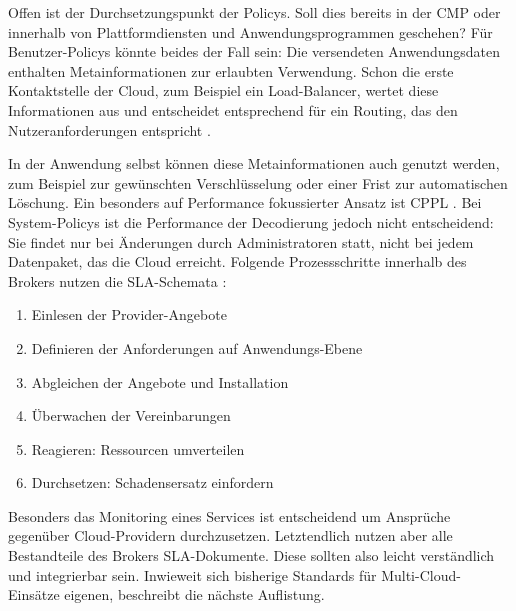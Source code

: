 Offen ist der Durchsetzungspunkt der Policys. Soll dies bereits in der CMP oder innerhalb von Plattformdiensten und Anwendungsprogrammen geschehen? Für Benutzer-Policys könnte beides der Fall sein: Die versendeten Anwendungsdaten enthalten Metainformationen zur erlaubten Verwendung. Schon die erste Kontaktstelle der Cloud, zum Beispiel ein Load-Balancer, wertet diese Informationen aus und entscheidet entsprechend für ein Routing, das den Nutzeranforderungen entspricht \cite{henze:2013:requirements-aware}. 

In der Anwendung selbst können diese Metainformationen auch genutzt werden, zum Beispiel zur gewünschten Verschlüsselung oder einer Frist zur automatischen Löschung. Ein besonders auf Performance fokussierter Ansatz ist CPPL \cite{henze:2016:cppl}. Bei System-Policys ist die Performance der Decodierung jedoch nicht entscheidend: Sie findet nur bei Änderungen durch Administratoren statt, nicht bei jedem Datenpaket, das die Cloud erreicht. Folgende Prozessschritte innerhalb des Brokers nutzen die SLA-Schemata \cite{koch:1996:policy-definition}:

\begin{enumerate}
	\item Einlesen der Provider-Angebote
	\item Definieren der Anforderungen auf Anwendungs-Ebene
	\item Abgleichen der Angebote und Installation
	\item Überwachen der Vereinbarungen
	\item Reagieren: Ressourcen umverteilen
	\item Durchsetzen: Schadensersatz einfordern
\end{enumerate}

\noindent
Besonders das Monitoring eines Services ist entscheidend um Ansprüche gegenüber Cloud-Providern durchzusetzen. Letztendlich nutzen aber alle Bestandteile des Brokers SLA-Dokumente. Diese sollten also leicht verständlich und integrierbar sein. Inwieweit sich bisherige Standards für Multi-Cloud-Einsätze eigenen, beschreibt die nächste Auflistung.

